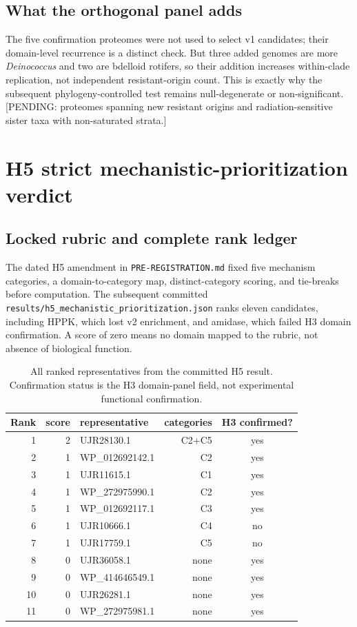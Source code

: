 \subsection{What the orthogonal panel adds}
The five confirmation proteomes were not used to select v1 candidates; their domain-level recurrence is a distinct check. But three added genomes are more \emph{Deinococcus} and two are bdelloid rotifers, so their addition increases within-clade replication, not independent resistant-origin count. This is exactly why the subsequent phylogeny-controlled test remains null-degenerate or non-significant. [PENDING: proteomes spanning new resistant origins and radiation-sensitive sister taxa with non-saturated strata.]
\section{H5 strict mechanistic-prioritization verdict}
\subsection{Locked rubric and complete rank ledger}
The dated H5 amendment in \texttt{PRE-REGISTRATION.md} fixed five mechanism categories, a domain-to-category map, distinct-category scoring, and tie-breaks before computation. The subsequent committed \texttt{results/h5\_mechanistic\_prioritization.json} ranks eleven candidates, including HPPK, which lost v2 enrichment, and amidase, which failed H3 domain confirmation. A score of zero means no domain mapped to the rubric, not absence of biological function.\begin{table}[!htbp]\centering\small\caption{All ranked representatives from the committed H5 result. Confirmation status is the H3 domain-panel field, not experimental functional confirmation.}\begin{tabular}{rrlrc}\hline Rank & score & representative & categories & H3 confirmed? \\\hline
1 & 2 & UJR28130.1 & C2+C5 & yes\\
2 & 1 & WP\_012692142.1 & C2 & yes\\
3 & 1 & UJR11615.1 & C1 & yes\\
4 & 1 & WP\_272975990.1 & C2 & yes\\
5 & 1 & WP\_012692117.1 & C3 & yes\\
6 & 1 & UJR10666.1 & C4 & no\\
7 & 1 & UJR17759.1 & C5 & no\\
8 & 0 & UJR36058.1 & none & yes\\
9 & 0 & WP\_414646549.1 & none & yes\\
10 & 0 & UJR26281.1 & none & yes\\
11 & 0 & WP\_272975981.1 & none & yes\\
\hline\end{tabular}\end{table}
